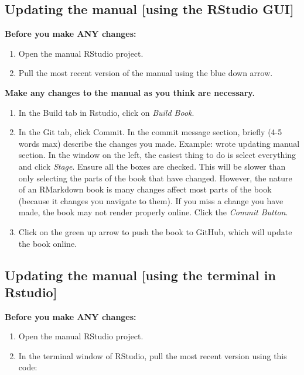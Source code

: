 \documentclass[]{book}
\providecommand{\tightlist}{%
  \setlength{\itemsep}{0pt}\setlength{\parskip}{0pt}}
\begin{document}
\hypertarget{updating-the-manual-using-the-rstudio-gui}{%
\subsection{Updating the manual {[}using the RStudio GUI{]}}\label{updating-the-manual-using-the-rstudio-gui}}

\textbf{Before you make ANY changes:}

\begin{enumerate}
\def\labelenumi{\arabic{enumi}.}
\tightlist
\item
  Open the manual RStudio project.
\item
  Pull the most recent version of the manual using the blue down arrow.
\end{enumerate}

\textbf{Make any changes to the manual as you think are necessary.}

\begin{enumerate}
\def\labelenumi{\arabic{enumi}.}
\setcounter{enumi}{2}
\tightlist
\item
  In the Build tab in Rstudio, click on \emph{Build Book}.
\item
  In the Git tab, click Commit. In the commit message section, briefly (4-5 words max) describe the changes you made. Example: wrote updating manual section. In the window on the left, the easiest thing to do is select everything and click \emph{Stage}. Ensure all the boxes are checked. This will be slower than only selecting the parts of the book that have changed. However, the nature of an RMarkdown book is many changes affect most parts of the book (because it changes you navigate to them). If you miss a change you have made, the book may not render properly online. Click the \emph{Commit Button}.
\item
  Click on the green up arrow to push the book to GitHub, which will update the book online.
\end{enumerate}

\hypertarget{updating-the-manual-using-the-terminal-in-rstudio}{%
\subsection{Updating the manual {[}using the terminal in Rstudio{]}}\label{updating-the-manual-using-the-terminal-in-rstudio}}

\textbf{Before you make ANY changes:}

\begin{enumerate}
\def\labelenumi{\arabic{enumi}.}
\tightlist
\item
  Open the manual RStudio project.
\item
  In the terminal window of RStudio, pull the most recent version using this code:
\end{enumerate}
\end{document}
